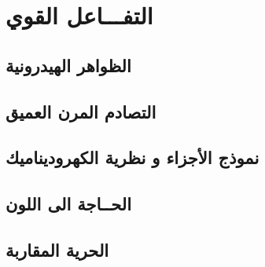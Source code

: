 \chapter{التفـــاعل القوي}

\label{Chapter4}


\section{الظواهر الهيدرونية}

\section{التصادم المرن العميق}

\section{نموذج الأجزاء و نظرية الكهروديناميك}

\section{الحــاجة الى اللون}

\section{الحرية المقاربة}

